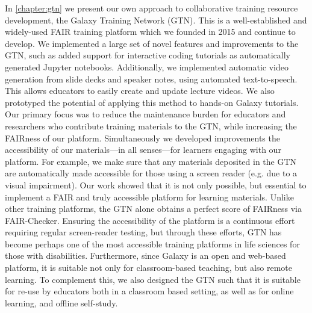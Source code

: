 In \cref{chapter:gtn} we present our own approach to collaborative training resource development, the Galaxy Training Network (GTN)\cite{gtn2,GTN_web}. This is a well-established and widely-used FAIR training platform which we founded in 2015 and continue to develop. We implemented a large set of novel features and improvements to the GTN, such as added support for interactive coding tutorials as automatically generated Jupyter notebooks. Additionally, we implemented automatic video generation from slide decks and speaker notes, using automated text-to-speech. This  allows educators to easily create and update lecture videos. We also prototyped the potential of applying this method to hands-on Galaxy tutorials. Our primary focus was to reduce the maintenance burden for educators and researchers who contribute training materials to the GTN, while increasing the FAIRness of our platform.
Simultaneously we developed improvements the accessibility of our materials---in all senses---for learners engaging with our platform. For example, we make sure that any materials deposited in the GTN are automatically made accessible for those using a screen reader (e.g. due to a visual impairment). Our work showed that it is not only possible, but essential to implement a FAIR and truly accessible platform for learning materials. Unlike other training platforms, the GTN alone obtains a perfect score of FAIRness\cite{GTN_fairchecker} via FAIR-Checker\cite{Gaignard_2023}. Ensuring the accessibility of the platform is a continuous effort requiring regular screen-reader testing, but through these efforts, GTN has become perhaps one of the most accessible training platforms in life sciences for those with disabilities.
Furthermore, since Galaxy is an open and web-based platform, it is suitable not only for classroom-based teaching, but also remote learning. To complement this, we also designed the GTN such that it is suitable for re-use by educators both in a classroom based setting, as well as for online learning, and offline self-study.

